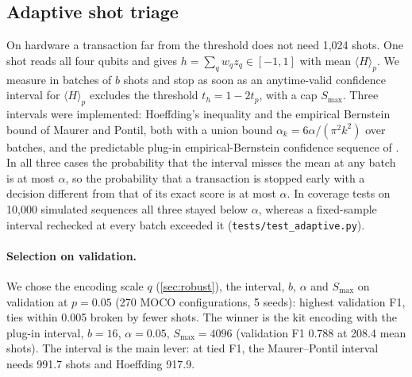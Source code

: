 \documentclass[10pt,twocolumn]{article}
\theoremstyle{definition}
\newcommand{\ex}[1]{\langle #1\rangle}
\begin{document}
\subsection{Adaptive shot triage}

On hardware a transaction far from the threshold does not need 1,024 shots. One shot reads all four qubits and
gives $h=\sum_q w_q z_q\in[-1,1]$ with mean $\ex H_p$. We measure in batches of $b$ shots and stop as soon as an
anytime-valid confidence interval for $\ex H_p$ excludes the threshold $t_h=1-2t_p$, with a cap $S_{\max}$.
Three intervals were implemented: Hoeffding's inequality and the empirical Bernstein bound of Maurer and
Pontil, both with a union bound $\alpha_k=6\alpha/(\pi^2k^2)$ over batches, and the predictable
plug-in empirical-Bernstein confidence sequence of \citet{waudbysmith2024betting}. In all three cases the
probability that the interval misses the mean at any batch is at most $\alpha$, so the probability that a
transaction is stopped early with a decision different from that of its exact score is at most $\alpha$. In
coverage tests on 10,000 simulated sequences all three stayed below $\alpha$, whereas a fixed-sample interval
rechecked at every batch exceeded it (\texttt{tests/test\_adaptive.py}).

\paragraph{Selection on validation.} We chose the encoding scale $q$ (\cref{sec:robust}), the interval, $b$,
$\alpha$ and $S_{\max}$ on validation at $p=0.05$ (270 MOCO configurations, 5 seeds): highest validation F1,
ties within 0.005 broken by fewer shots. The winner is the kit encoding with the plug-in interval, $b=16$,
$\alpha=0.05$, $S_{\max}=4096$ (validation F1 0.788 at 208.4 mean shots). The interval is the main lever: at tied
F1, the Maurer--Pontil interval needs 991.7 shots and Hoeffding 917.9.
\end{document}
